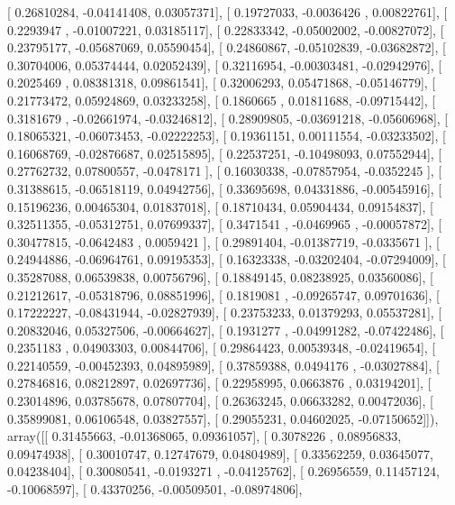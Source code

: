 \documentclass{article}
\begin{document}
       [ 0.26810284, -0.04141408,  0.03057371],
       [ 0.19727033, -0.0036426 ,  0.00822761],
       [ 0.2293947 , -0.01007221,  0.03185117],
       [ 0.22833342, -0.05002002, -0.00827072],
       [ 0.23795177, -0.05687069,  0.05590454],
       [ 0.24860867, -0.05102839, -0.03682872],
       [ 0.30704006,  0.05374444,  0.02052439],
       [ 0.32116954, -0.00303481, -0.02942976],
       [ 0.2025469 ,  0.08381318,  0.09861541],
       [ 0.32006293,  0.05471868, -0.05146779],
       [ 0.21773472,  0.05924869,  0.03233258],
       [ 0.1860665 ,  0.01811688, -0.09715442],
       [ 0.3181679 , -0.02661974, -0.03246812],
       [ 0.28909805, -0.03691218, -0.05606968],
       [ 0.18065321, -0.06073453, -0.02222253],
       [ 0.19361151,  0.00111554, -0.03233502],
       [ 0.16068769, -0.02876687,  0.02515895],
       [ 0.22537251, -0.10498093,  0.07552944],
       [ 0.27762732,  0.07800557, -0.0478171 ],
       [ 0.16030338, -0.07857954, -0.0352245 ],
       [ 0.31388615, -0.06518119,  0.04942756],
       [ 0.33695698,  0.04331886, -0.00545916],
       [ 0.15196236,  0.00465304,  0.01837018],
       [ 0.18710434,  0.05904434,  0.09154837],
       [ 0.32511355, -0.05312751,  0.07699337],
       [ 0.3471541 , -0.0469965 , -0.00057872],
       [ 0.30477815, -0.0642483 ,  0.0059421 ],
       [ 0.29891404, -0.01387719, -0.0335671 ],
       [ 0.24944886, -0.06964761,  0.09195353],
       [ 0.16323338, -0.03202404, -0.07294009],
       [ 0.35287088,  0.06539838,  0.00756796],
       [ 0.18849145,  0.08238925,  0.03560086],
       [ 0.21212617, -0.05318796,  0.08851996],
       [ 0.1819081 , -0.09265747,  0.09701636],
       [ 0.17222227, -0.08431944, -0.02827939],
       [ 0.23753233,  0.01379293,  0.05537281],
       [ 0.20832046,  0.05327506, -0.00664627],
       [ 0.1931277 , -0.04991282, -0.07422486],
       [ 0.2351183 ,  0.04903303,  0.00844706],
       [ 0.29864423,  0.00539348, -0.02419654],
       [ 0.22140559, -0.00452393,  0.04895989],
       [ 0.37859388,  0.0494176 , -0.03027884],
       [ 0.27846816,  0.08212897,  0.02697736],
       [ 0.22958995,  0.0663876 ,  0.03194201],
       [ 0.23014896,  0.03785678,  0.07807704],
       [ 0.26363245,  0.06633282,  0.00472036],
       [ 0.35899081,  0.06106548,  0.03827557],
       [ 0.29055231,  0.04602025, -0.07150652]]), array([[ 0.31455663, -0.01368065,  0.09361057],
       [ 0.3078226 ,  0.08956833,  0.09474938],
       [ 0.30010747,  0.12747679,  0.04804989],
       [ 0.33562259,  0.03645077,  0.04238404],
       [ 0.30080541, -0.0193271 , -0.04125762],
       [ 0.26956559,  0.11457124, -0.10068597],
       [ 0.43370256, -0.00509501, -0.08974806],
\end{document}
